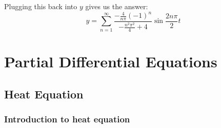 \documentclass[12pt]{report}
\begin{document}
Plugging this back into $y$ gives us the answer:
$$y = \sum_{n=1}^{\infty} \frac{-\frac{4}{n\pi} (-1)^n}{-\frac{n^2\pi^2}{4}+4} \sin \frac{2n\pi}{2} t$$


\chapter{Partial Differential Equations}

\section{Heat Equation}

\subsection*{Introduction to heat equation }
\end{document}
